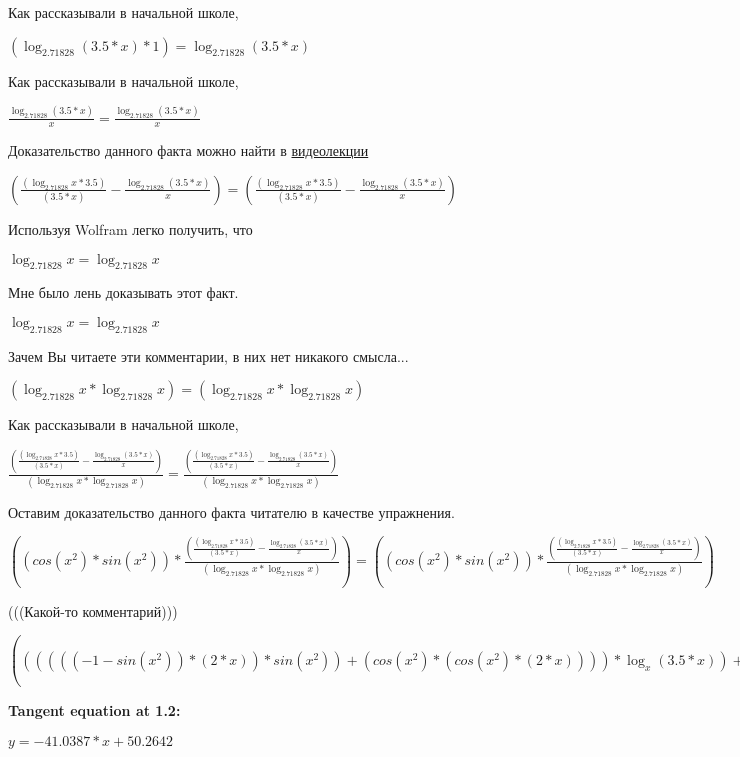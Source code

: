 \documentclass[12pt,a4paper,fleqn]{article}
\theoremstyle{definition}
\begin{document}
Как рассказывали в начальной школе,

$(\log_{ 2.71828 }{( 3.5  *  x )} *  1 ) = \log_{ 2.71828 }{( 3.5  *  x )}$

Как рассказывали в начальной школе,

$\frac{\log_{ 2.71828 }{( 3.5  *  x )}}{ x }
 = \frac{\log_{ 2.71828 }{( 3.5  *  x )}}{ x }
$

Доказательство данного факта можно найти в \href{https://www.youtube.com/watch?v=dQw4w9WgXcQ}{видеолекции}

$(\frac{(\log_{ 2.71828 }{ x } *  3.5 )}{( 3.5  *  x )}
 - \frac{\log_{ 2.71828 }{( 3.5  *  x )}}{ x }
) = (\frac{(\log_{ 2.71828 }{ x } *  3.5 )}{( 3.5  *  x )}
 - \frac{\log_{ 2.71828 }{( 3.5  *  x )}}{ x }
)$

Используя Wolfram легко получить, что

$\log_{ 2.71828 }{ x } = \log_{ 2.71828 }{ x }$

Мне было лень доказывать этот факт.

$\log_{ 2.71828 }{ x } = \log_{ 2.71828 }{ x }$

Зачем Вы читаете эти комментарии, в них нет никакого смысла...

$(\log_{ 2.71828 }{ x } * \log_{ 2.71828 }{ x }) = (\log_{ 2.71828 }{ x } * \log_{ 2.71828 }{ x })$

Как рассказывали в начальной школе,

$\frac{(\frac{(\log_{ 2.71828 }{ x } *  3.5 )}{( 3.5  *  x )}
 - \frac{\log_{ 2.71828 }{( 3.5  *  x )}}{ x }
)}{(\log_{ 2.71828 }{ x } * \log_{ 2.71828 }{ x })}
 = \frac{(\frac{(\log_{ 2.71828 }{ x } *  3.5 )}{( 3.5  *  x )}
 - \frac{\log_{ 2.71828 }{( 3.5  *  x )}}{ x }
)}{(\log_{ 2.71828 }{ x } * \log_{ 2.71828 }{ x })}
$

Оставим доказательство данного факта читателю в качестве упражнения.

$((cos({ x }^{ 2 }) * sin({ x }^{ 2 })) * \frac{(\frac{(\log_{ 2.71828 }{ x } *  3.5 )}{( 3.5  *  x )}
 - \frac{\log_{ 2.71828 }{( 3.5  *  x )}}{ x }
)}{(\log_{ 2.71828 }{ x } * \log_{ 2.71828 }{ x })}
) = ((cos({ x }^{ 2 }) * sin({ x }^{ 2 })) * \frac{(\frac{(\log_{ 2.71828 }{ x } *  3.5 )}{( 3.5  *  x )}
 - \frac{\log_{ 2.71828 }{( 3.5  *  x )}}{ x }
)}{(\log_{ 2.71828 }{ x } * \log_{ 2.71828 }{ x })}
)$

(((Какой-то комментарий)))

$(((((( -1  - sin({ x }^{ 2 })) * ( 2  *  x )) * sin({ x }^{ 2 })) + (cos({ x }^{ 2 }) * (cos({ x }^{ 2 }) * ( 2  *  x )))) * \log_{ x }{( 3.5  *  x )}) + ((cos({ x }^{ 2 }) * sin({ x }^{ 2 })) * \frac{(\frac{(\log_{ 2.71828 }{ x } *  3.5 )}{( 3.5  *  x )}
 - \frac{\log_{ 2.71828 }{( 3.5  *  x )}}{ x }
)}{(\log_{ 2.71828 }{ x } * \log_{ 2.71828 }{ x })}
)) = (((((( -1  - sin({ x }^{ 2 })) * ( 2  *  x )) * sin({ x }^{ 2 })) + (cos({ x }^{ 2 }) * (cos({ x }^{ 2 }) * ( 2  *  x )))) * \log_{ x }{( 3.5  *  x )}) + ((cos({ x }^{ 2 }) * sin({ x }^{ 2 })) * \frac{(\frac{(\log_{ 2.71828 }{ x } *  3.5 )}{( 3.5  *  x )}
 - \frac{\log_{ 2.71828 }{( 3.5  *  x )}}{ x }
)}{(\log_{ 2.71828 }{ x } * \log_{ 2.71828 }{ x })}
))$


\textbf{Tangent equation at 1.2:}

$y = -41.0387 * x + 50.2642$
\end{document}
